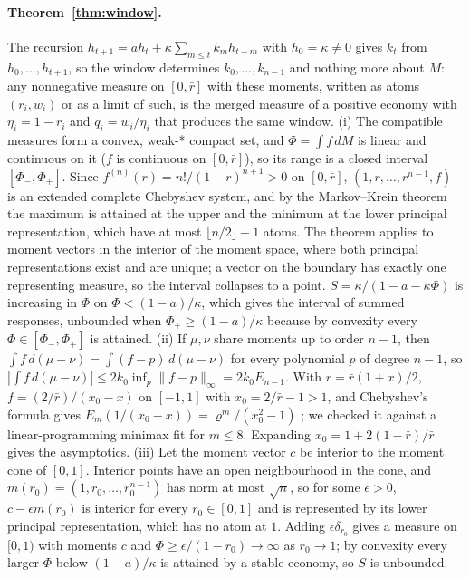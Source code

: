 \paragraph{Theorem~\ref{thm:window}.} The recursion $h_{t+1}=ah_t+\kappa\sum_{m\le t}k_mh_{t-m}$ with $h_0=\kappa\neq0$ gives $k_t$ from $h_0,\ldots,h_{t+1}$, so the window determines $k_0,\ldots,k_{n-1}$ and nothing more about $M$: any nonnegative measure on $[0,\bar r]$ with these moments, written as atoms $(r_i,w_i)$ or as a limit of such, is the merged measure of a positive economy with $\eta_i=1-r_i$ and $q_i=w_i/\eta_i$ that produces the same window. (i) The compatible measures form a convex, weak-* compact set, and $\Phi=\int f\,dM$ is linear and continuous on it ($f$ is continuous on $[0,\bar r]$), so its range is a closed interval $[\Phi_-,\Phi_+]$. Since $f^{(n)}(r)=n!/(1-r)^{n+1}>0$ on $[0,\bar r]$, $(1,r,\ldots,r^{n-1},f)$ is an extended complete Chebyshev system, and by the Markov--Krein theorem \citep[Theorems IV.1.1 and IV.6.1]{krein1977} the maximum is attained at the upper and the minimum at the lower principal representation, which have at most $\lfloor n/2\rfloor+1$ atoms. The theorem applies to moment vectors in the interior of the moment space, where both principal representations exist and are unique; a vector on the boundary has exactly one representing measure, so the interval collapses to a point. $S=\kappa/(1-a-\kappa\Phi)$ is increasing in $\Phi$ on $\Phi<(1-a)/\kappa$, which gives the interval of summed responses, unbounded when $\Phi_+\ge(1-a)/\kappa$ because by convexity every $\Phi\in[\Phi_-,\Phi_+]$ is attained. (ii) If $\mu,\nu$ share moments up to order $n-1$, then $\int f\,d(\mu-\nu)=\int(f-p)\,d(\mu-\nu)$ for every polynomial $p$ of degree $n-1$, so $|\int f\,d(\mu-\nu)|\le2k_0\inf_p\|f-p\|_\infty=2k_0E_{n-1}$. With $r=\bar r(1+x)/2$, $f=(2/\bar r)/(x_0-x)$ on $[-1,1]$ with $x_0=2/\bar r-1>1$, and Chebyshev's formula gives $E_m(1/(x_0-x))=\varrho^m/(x_0^2-1)$ \citep{achieser1956}; we checked it against a linear-programming minimax fit for $m\le8$. Expanding $x_0=1+2(1-\bar r)/\bar r$ gives the asymptotics. (iii) Let the moment vector $c$ be interior to the moment cone of $[0,1]$. Interior points have an open neighbourhood in the cone, and $m(r_0)=(1,r_0,\ldots,r_0^{n-1})$ has norm at most $\sqrt n$, so for some $\epsilon>0$, $c-\epsilon m(r_0)$ is interior for every $r_0\in[0,1]$ and is represented by its lower principal representation, which has no atom at $1$. Adding $\epsilon\delta_{r_0}$ gives a measure on $[0,1)$ with moments $c$ and $\Phi\ge\epsilon/(1-r_0)\to\infty$ as $r_0\to1$; by convexity every larger $\Phi$ below $(1-a)/\kappa$ is attained by a stable economy, so $S$ is unbounded.


